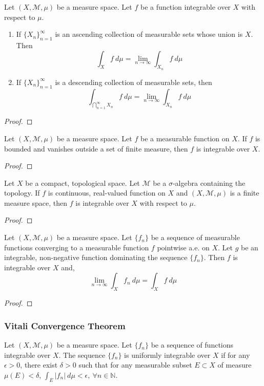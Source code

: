 \begin{theorem}
	Let $(X,\mathcal{M},\mu)$ be a measure space.
	Let $f$ be a function integrable over $X$ with respect to $\mu$.
	\begin{enumerate}
		\item If $\{ X_n \}_{n=1}^\infty$ is an ascending collection of measurable sets whose union is $X$.
			Then
			$$ \int_X f \ d\mu = \lim_{n \to \infty} \int_{X_n} f \ d \mu $$
		\item If $\{ X_n \}_{n =1}^\infty$ is a descending collection of measurable sets, then
			$$ \int_{\bigcap_{n = 1}^\infty X_n} f \ d\mu = \lim_{n \to \infty} \int_{X_n} f \ d\mu $$
	\end{enumerate}
\end{theorem}
\begin{proof}
\end{proof}

\begin{theorem}
	Let $(X,\mathcal{M},\mu)$ be a measure space.
	Let $f$ be a measurable function on $X$.
	If $f$ is bounded and vanishes outside a set of finite measure, then $f$ is integrable over $X$.
\end{theorem}
\begin{proof}
\end{proof}

\begin{corollary}
	Let $X$ be a compact, topological space.
	Let $\mathcal{M}$ be a $\sigma$-algebra containing the topology.
	If $f$ is continuous, real-valued function on $X$ and $(X,\mathcal{M},\mu)$ is a finite measure space, then $f$ is integrable over $X$ with respect to $\mu$.
\end{corollary}
\begin{proof}
\end{proof}

\begin{theorem}
	Let $(X,\mathcal{M},\mu)$ be a measure space.
	Let $\{ f_n \}$ be a sequence of measurable functions converging to a measurable function $f$ pointwise a.e. on $X$.
	Let $g$ be an integrable, non-negative function dominating the sequence $\{ f_n \}$.
	Then $f$ is integrable over $X$ and,
	$$ \lim_{n \to \infty} \int_X f_n \ d\mu = \int_X f \ d\mu $$
\end{theorem}
\begin{proof}
\end{proof}

\subsubsection{Vitali Convergence Theorem}
\begin{definition}
	Let $(X,\mathcal{M},\mu)$ be a measure space.
	Let $\{ f_n \}$ be a sequence of functions integrable over $X$.
	The sequence $\{ f_n \}$ is uniformly integrable over $X$ if for any $\epsilon > 0$, there exist $\delta > 0$ such that for any measurable subset $E \subset X$ of measure $\mu(E) < \delta$, $\displaystyle \int_E |f_n| \ d\mu < \epsilon,\ \forall n \in \mathbb{N}$.
\end{definition}

